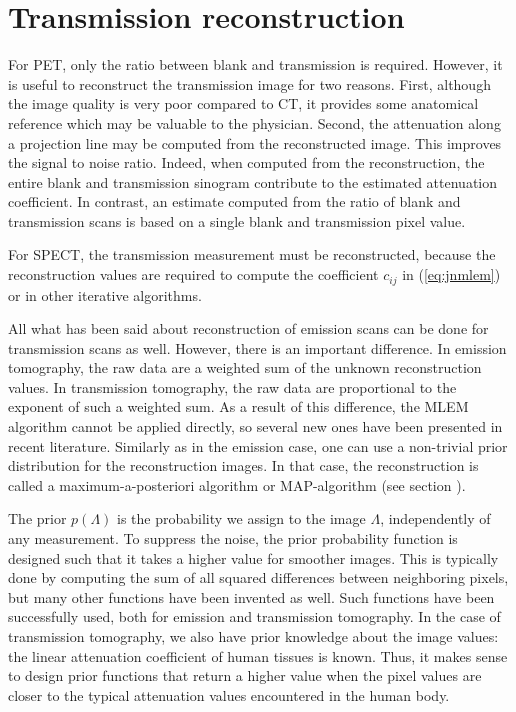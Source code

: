 \section{Transmission reconstruction}
For PET, only the ratio between blank and transmission is required. However,
it is useful to reconstruct the transmission image for two reasons. First,
although the image quality is very poor compared to CT, it provides some
anatomical reference which may be valuable to the physician. Second, the
attenuation along a projection line may be computed from the reconstructed
image. This improves the signal to noise ratio. Indeed, when computed from the
reconstruction, the entire blank and transmission sinogram contribute to the
estimated attenuation coefficient. In contrast, an estimate computed from the
ratio of blank and transmission scans is based on a single blank and
transmission pixel value.

For SPECT, the transmission measurement must be reconstructed, because the
reconstruction values are required to compute the coefficient $c_{ij}$ in
(\ref{eq:jnmlem}) or in other iterative algorithms.

All what has been said about reconstruction of emission scans can be done for
transmission scans as well. However, there is an important difference. In
emission tomography, the raw data are a weighted sum of the unknown
reconstruction values. In transmission tomography, the raw data are
proportional to the exponent of such a weighted sum. As a result of this
difference, the MLEM algorithm cannot be applied directly, so several new
ones have been presented in recent literature. Similarly as in the emission
case, one can use a non-trivial prior distribution for the reconstruction
images. In that case, the reconstruction is called a maximum-a-posteriori
algorithm or MAP-algorithm (see section ).

The prior $p(\Lambda)$ is the probability we assign to the image $\Lambda$,
independently of any measurement. To suppress the noise, the prior probability
function is designed such that it takes a higher value for smoother images.
This is typically done by computing the sum of all squared differences between
neighboring pixels, but many other functions have been invented as well.
Such functions have been successfully used, both for emission and transmission
tomography. In the case of transmission tomography, we also have prior knowledge
about the image values: the linear attenuation coefficient of human tissues is
known. Thus, it makes sense to design prior functions that return a higher value
when the pixel values are closer to the typical attenuation values encountered
in the human body.

